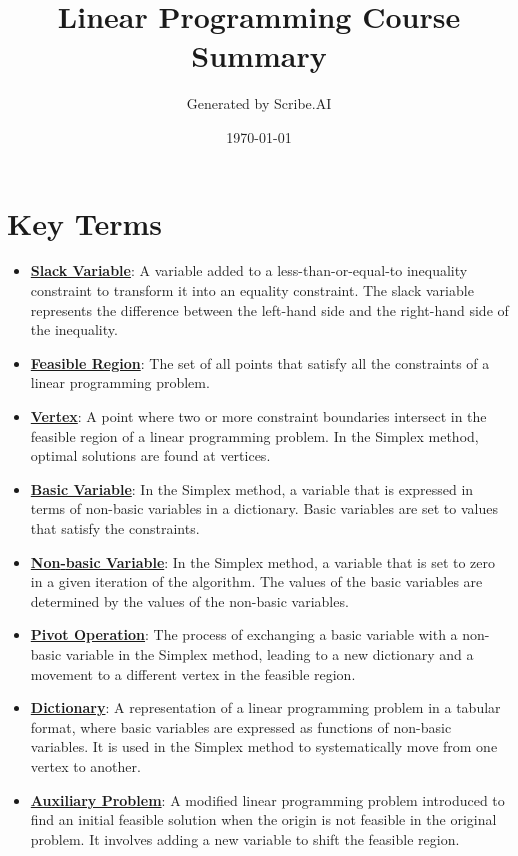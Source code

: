 \documentclass{article}%
\title{Linear Programming Course Summary}%
\author{Generated by Scribe.AI}%
\date{\today}%
\begin{document}
%
\normalsize%
\maketitle%
\section{Key Terms}%
\label{sec:KeyTerms}%
\begin{itemize}[leftmargin=*]%
\item \href{https://www.math.purdue.edu/~yipn/421/2024-08-27-ExSimplex.pdf#page=1}{\textbf{Slack Variable}}: A variable added to a less-than-or-equal-to inequality constraint to transform it into an equality constraint. The slack variable represents the difference between the left-hand side and the right-hand side of the inequality.%
\item \href{https://www.math.purdue.edu/~yipn/421/2024-08-27-ExSimplex.pdf#page=4}{\textbf{Feasible Region}}: The set of all points that satisfy all the constraints of a linear programming problem.%
\item \href{https://www.math.purdue.edu/~yipn/421/2024-08-27-ExSimplex.pdf#page=5}{\textbf{Vertex}}: A point where two or more constraint boundaries intersect in the feasible region of a linear programming problem. In the Simplex method, optimal solutions are found at vertices.%
\item \href{https://www.math.purdue.edu/~yipn/421/2024-08-27-ExSimplex.pdf#page=6}{\textbf{Basic Variable}}: In the Simplex method, a variable that is expressed in terms of non-basic variables in a dictionary. Basic variables are set to values that satisfy the constraints.%
\item \href{https://www.math.purdue.edu/~yipn/421/2024-08-27-ExSimplex.pdf#page=6}{\textbf{Non{-}basic Variable}}: In the Simplex method, a variable that is set to zero in a given iteration of the algorithm. The values of the basic variables are determined by the values of the non-basic variables.%
\item \href{https://www.math.purdue.edu/~yipn/421/2024-08-27-ExSimplex.pdf#page=9}{\textbf{Pivot Operation}}: The process of exchanging a basic variable with a non-basic variable in the Simplex method, leading to a new dictionary and a movement to a different vertex in the feasible region.%
\item \href{https://www.math.purdue.edu/~yipn/421/2024-08-27-ExSimplex.pdf#page=26}{\textbf{Dictionary}}: A representation of a linear programming problem in a tabular format, where basic variables are expressed as functions of non-basic variables. It is used in the Simplex method to systematically move from one vertex to another.%
\item \href{https://www.math.purdue.edu/~yipn/421/2024-08-27-ExSimplex.pdf#page=32}{\textbf{Auxiliary Problem}}: A modified linear programming problem introduced to find an initial feasible solution when the origin is not feasible in the original problem. It involves adding a new variable to shift the feasible region.%
\end{itemize}
\end{document}
